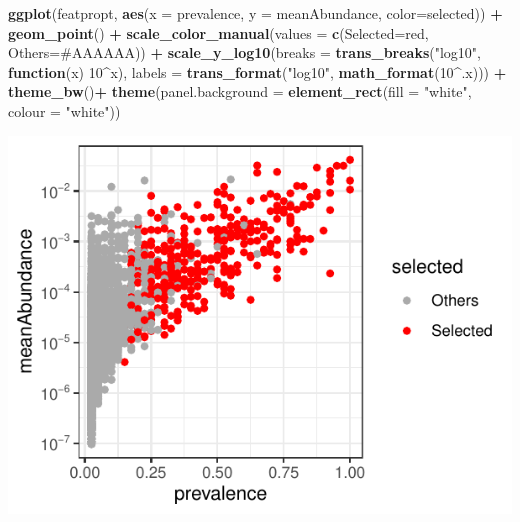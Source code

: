 \documentclass[
]{article}
\newenvironment{Shaded}{\begin{snugshade}}{\end{snugshade}}
\newcommand{\AttributeTok}[1]{\textcolor[rgb]{0.13,0.29,0.53}{#1}}
\newcommand{\ControlFlowTok}[1]{\textcolor[rgb]{0.13,0.29,0.53}{\textbf{#1}}}
\newcommand{\DecValTok}[1]{\textcolor[rgb]{0.00,0.00,0.81}{#1}}
\newcommand{\FunctionTok}[1]{\textcolor[rgb]{0.13,0.29,0.53}{\textbf{#1}}}
\newcommand{\NormalTok}[1]{#1}
\newcommand{\OtherTok}[1]{\textcolor[rgb]{0.56,0.35,0.01}{#1}}
\newcommand{\SpecialCharTok}[1]{\textcolor[rgb]{0.81,0.36,0.00}{\textbf{#1}}}
\newcommand{\StringTok}[1]{\textcolor[rgb]{0.31,0.60,0.02}{#1}}
\begin{document}
\begin{Shaded}
\begin{Highlighting}[]
\FunctionTok{ggplot}\NormalTok{(featpropt, }\FunctionTok{aes}\NormalTok{(}\AttributeTok{x =}\NormalTok{ prevalence, }\AttributeTok{y =}\NormalTok{ meanAbundance, }\AttributeTok{color=}\NormalTok{selected)) }\SpecialCharTok{+} \FunctionTok{geom\_point}\NormalTok{() }\SpecialCharTok{+}
  \FunctionTok{scale\_color\_manual}\NormalTok{(}\AttributeTok{values =} \FunctionTok{c}\NormalTok{(}\StringTok{\textquotesingle{}Selected\textquotesingle{}}\OtherTok{=}\StringTok{\textquotesingle{}red\textquotesingle{}}\NormalTok{, }\StringTok{\textquotesingle{}Others\textquotesingle{}}\OtherTok{=}\StringTok{\textquotesingle{}\#AAAAAA\textquotesingle{}}\NormalTok{)) }\SpecialCharTok{+} 
  \FunctionTok{scale\_y\_log10}\NormalTok{(}\AttributeTok{breaks =} \FunctionTok{trans\_breaks}\NormalTok{(}\StringTok{"log10"}\NormalTok{, }\ControlFlowTok{function}\NormalTok{(x) }\DecValTok{10}\SpecialCharTok{\^{}}\NormalTok{x),}
                \AttributeTok{labels =} \FunctionTok{trans\_format}\NormalTok{(}\StringTok{"log10"}\NormalTok{, }\FunctionTok{math\_format}\NormalTok{(}\DecValTok{10}\SpecialCharTok{\^{}}\NormalTok{.x))) }\SpecialCharTok{+}
  \FunctionTok{theme\_bw}\NormalTok{()}\SpecialCharTok{+} \FunctionTok{theme}\NormalTok{(}\AttributeTok{panel.background =} \FunctionTok{element\_rect}\NormalTok{(}\AttributeTok{fill =} \StringTok{"white"}\NormalTok{, }\AttributeTok{colour =} \StringTok{"white"}\NormalTok{))}
\end{Highlighting}
\end{Shaded}

\includegraphics{workshop_files/figure-latex/unnamed-chunk-49-1.pdf}
\end{document}
